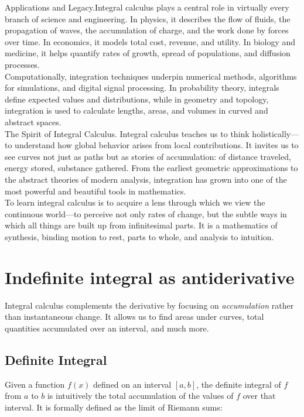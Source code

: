 \documentclass{book}
\begin{document}
Applications and Legacy.Integral calculus plays a central role in virtually every branch of science and engineering. In physics, it describes the flow of fluids, the propagation of waves, the accumulation of charge, and the work done by forces over time. In economics, it models total cost, revenue, and utility. In biology and medicine, it helps quantify rates of growth, spread of populations, and diffusion processes.\\

Computationally, integration techniques underpin numerical methods, algorithms for simulations, and digital signal processing. In probability theory, integrals define expected values and distributions, while in geometry and topology, integration is used to calculate lengths, areas, and volumes in curved and abstract spaces.\\

The Spirit of Integral Calculus. Integral calculus teaches us to think holistically---to understand how global behavior arises from local contributions. It invites us to see curves not just as paths but as stories of accumulation: of distance traveled, energy stored, substance gathered. From the earliest geometric approximations to the abstract theories of modern analysis, integration has grown into one of the most powerful and beautiful tools in mathematics.\\

To learn integral calculus is to acquire a lens through which we view the continuous world---to perceive not only rates of change, but the subtle ways in which all things are built up from infinitesimal parts. It is a mathematics of synthesis, binding motion to rest, parts to whole, and analysis to intuition.

\section{Indefinite integral as antiderivative}

Integral calculus complements the derivative by focusing on \emph{accumulation} rather than instantaneous change. It allows us to find areas under curves, total quantities accumulated over an interval, and much more.

\subsection*{Definite Integral}

Given a function \( f(x) \) defined on an interval \([a, b]\), the definite integral of \( f \) from \( a \) to \( b \) is intuitively the total accumulation of the values of \( f \) over that interval. It is formally defined as the limit of Riemann sums:
\end{document}
